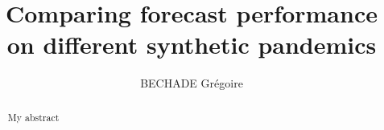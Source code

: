 \documentclass{article}
\title{Comparing forecast performance on different synthetic pandemics }
\author{BECHADE Grégoire}
\begin{document}
\maketitle


\begin{abstract}

    My abstract 

\end{abstract}








\printbibliography
\end{document}
